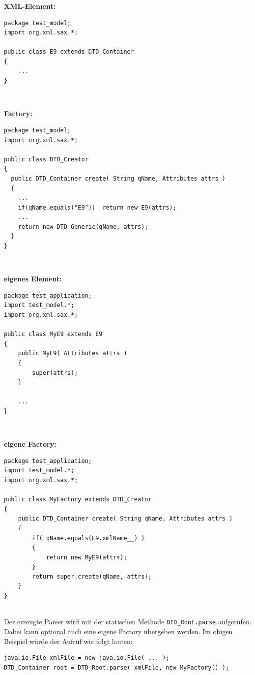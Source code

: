 \documentclass [a4paper,12pt] {scrartcl}
\begin{document}
\begin{minipage}{\linewidth}
\textbf{XML-Element:}
\begin{verbatim}
package test_model;
import org.xml.sax.*;

public class E9 extends DTD_Container
{
    ...
}
\end{verbatim}
\end{minipage}
~\\[4ex]
\begin{minipage}{\linewidth}
\textbf{Factory:}
\begin{verbatim}
package test_model;
import org.xml.sax.*;

public class DTD_Creator
{
  public DTD_Container create( String qName, Attributes attrs )
  {
    ...
    if(qName.equals("E9"))  return new E9(attrs);
    ...
    return new DTD_Generic(qName, attrs);
  }
}
\end{verbatim}
\end{minipage}
~\\[4ex]
\begin{minipage}{\linewidth}
\textbf{eigenes Element:}
\begin{verbatim}
package test_application;
import test_model.*;
import org.xml.sax.*;

public class MyE9 extends E9
{
    public MyE9( Attributes attrs )
    {
        super(attrs);
    }

    ...
}
\end{verbatim}
\end{minipage}
~\\[4ex]
\begin{minipage}{\linewidth}
\textbf{eigene Factory:}
\begin{verbatim}
package test_application;
import test_model.*;
import org.xml.sax.*;

public class MyFactory extends DTD_Creator
{
    public DTD_Container create( String qName, Attributes attrs )
    {
        if( qName.equals(E9.xmlName__) )
        {
            return new MyE9(attrs);
        }
        return super.create(qName, attrs);
    }
}
\end{verbatim}
\end{minipage}
~\\[4ex]
Der erzeugte Parser wird mit der statischen Methode \texttt{DTD\_Root.parse} aufgerufen.
Dabei kann optional auch eine eigene Factory {\"u}bergeben werden. Im obigen Beispiel
w{\"u}rde der Aufruf wie folgt lauten:
\begin{verbatim}
java.io.File xmlFile = new java.io.File( ... );
DTD_Container root = DTD_Root.parse( xmlFile, new MyFactory() );
\end{verbatim}
\end{document}
